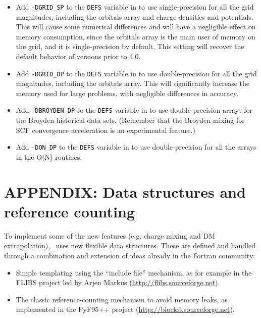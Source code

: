 \begin{itemize}

  \item Add \texttt{-DGRID\_SP} to the \texttt{DEFS} variable in
   to use single-precision for all the grid
  magnitudes, including the orbitals array and charge densities and
  potentials.  This will cause some numerical differences and will
  have a negligible effect on memory consumption, since the orbitals
  array is the main user of memory on the grid, and it is
  single-precision by default. This setting will recover the default
  behavior of versions prior to 4.0.

  \item Add \texttt{-DGRID\_DP} to the \texttt{DEFS} variable in
   to use double-precision for all the grid
  magnitudes, including the orbitals array. This will significantly
  increase the memory used for large problems, with negligible
  differences in accuracy.


  \item Add \texttt{-DBROYDEN\_DP} to the \texttt{DEFS} variable in
   to use double-precision arrays for the Broyden
  historical data sets. (Remember that the Broyden mixing for SCF
  convergence acceleration is an experimental feature.)

  \item Add \texttt{-DON\_DP} to the \texttt{DEFS} variable in
   to use double-precision for all the arrays in the
  O(N) routines.

\end{itemize}

\newpage
\section{APPENDIX: Data structures and reference counting}

To implement some of the new features (e.g. charge mixing
and DM extrapolation), \siesta\ uses new flexible data structures. These are defined and
handled through a combination and extension of ideas already in the
Fortran community:
\begin{itemize}
\item Simple templating using the ``include file'' mechanism, as for example in
  the FLIBS project led by Arjen Markus
  (\url{http://flibs.sourceforge.net}).
\item The classic reference-counting mechanism to avoid memory leaks, as
  implemented in the PyF95++ project
  (\url{http://blockit.sourceforge.net}).
\end{itemize}

